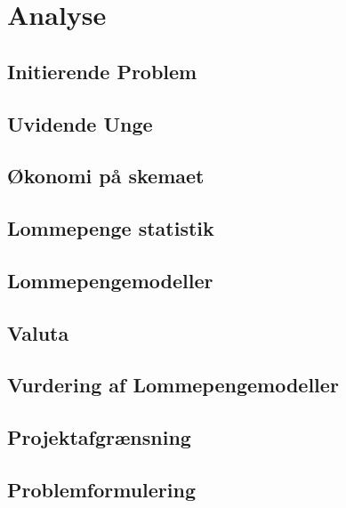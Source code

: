 





\tableofcontents

\chapter{Analyse}

\section{Initierende Problem}


\section{Uvidende Unge}
\label{UvidendeUnge}


\section{Økonomi på skemaet}
\label{Okonomi}


\section{Lommepenge statistik}
\label{LommeStat}


\section{Lommepengemodeller}
\label{LommeModeller}


\section{Valuta}
\label{Valuta}


\section{Vurdering af Lommepengemodeller}
\label{ModelVurdering}


\section{Projektafgrænsning}


\section{Problemformulering}



%





